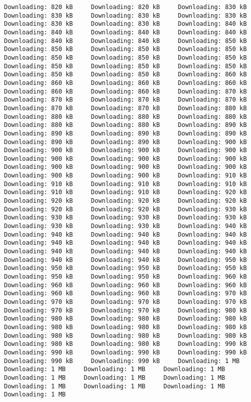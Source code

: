\documentclass[gc, manuscript]{copernicus}
\begin{document}
\begin{verbatim}
Downloading: 820 kB     Downloading: 820 kB     Downloading: 830 kB     Downloading: 830 kB     Downloading: 830 kB     Downloading: 830 kB     Downloading: 830 kB     Downloading: 830 kB     Downloading: 840 kB     Downloading: 840 kB     Downloading: 840 kB     Downloading: 840 kB     Downloading: 840 kB     Downloading: 840 kB     Downloading: 850 kB     Downloading: 850 kB     Downloading: 850 kB     Downloading: 850 kB     Downloading: 850 kB     Downloading: 850 kB     Downloading: 850 kB     Downloading: 850 kB     Downloading: 850 kB     Downloading: 850 kB     Downloading: 850 kB     Downloading: 850 kB     Downloading: 860 kB     Downloading: 860 kB     Downloading: 860 kB     Downloading: 860 kB     Downloading: 860 kB     Downloading: 860 kB     Downloading: 870 kB     Downloading: 870 kB     Downloading: 870 kB     Downloading: 870 kB     Downloading: 870 kB     Downloading: 870 kB     Downloading: 880 kB     Downloading: 880 kB     Downloading: 880 kB     Downloading: 880 kB     Downloading: 880 kB     Downloading: 880 kB     Downloading: 890 kB     Downloading: 890 kB     Downloading: 890 kB     Downloading: 890 kB     Downloading: 890 kB     Downloading: 890 kB     Downloading: 900 kB     Downloading: 900 kB     Downloading: 900 kB     Downloading: 900 kB     Downloading: 900 kB     Downloading: 900 kB     Downloading: 900 kB     Downloading: 900 kB     Downloading: 900 kB     Downloading: 900 kB     Downloading: 900 kB     Downloading: 900 kB     Downloading: 910 kB     Downloading: 910 kB     Downloading: 910 kB     Downloading: 910 kB     Downloading: 910 kB     Downloading: 910 kB     Downloading: 920 kB     Downloading: 920 kB     Downloading: 920 kB     Downloading: 920 kB     Downloading: 920 kB     Downloading: 920 kB     Downloading: 930 kB     Downloading: 930 kB     Downloading: 930 kB     Downloading: 930 kB     Downloading: 930 kB     Downloading: 930 kB     Downloading: 940 kB     Downloading: 940 kB     Downloading: 940 kB     Downloading: 940 kB     Downloading: 940 kB     Downloading: 940 kB     Downloading: 940 kB     Downloading: 940 kB     Downloading: 940 kB     Downloading: 940 kB     Downloading: 940 kB     Downloading: 940 kB     Downloading: 950 kB     Downloading: 950 kB     Downloading: 950 kB     Downloading: 950 kB     Downloading: 950 kB     Downloading: 950 kB     Downloading: 960 kB     Downloading: 960 kB     Downloading: 960 kB     Downloading: 960 kB     Downloading: 960 kB     Downloading: 960 kB     Downloading: 970 kB     Downloading: 970 kB     Downloading: 970 kB     Downloading: 970 kB     Downloading: 970 kB     Downloading: 970 kB     Downloading: 980 kB     Downloading: 980 kB     Downloading: 980 kB     Downloading: 980 kB     Downloading: 980 kB     Downloading: 980 kB     Downloading: 980 kB     Downloading: 980 kB     Downloading: 980 kB     Downloading: 980 kB     Downloading: 980 kB     Downloading: 980 kB     Downloading: 990 kB     Downloading: 990 kB     Downloading: 990 kB     Downloading: 990 kB     Downloading: 990 kB     Downloading: 990 kB     Downloading: 1 MB     Downloading: 1 MB     Downloading: 1 MB     Downloading: 1 MB     Downloading: 1 MB     Downloading: 1 MB     Downloading: 1 MB     Downloading: 1 MB     Downloading: 1 MB     Downloading: 1 MB     Downloading: 1 MB     
\end{verbatim}
\end{document}
